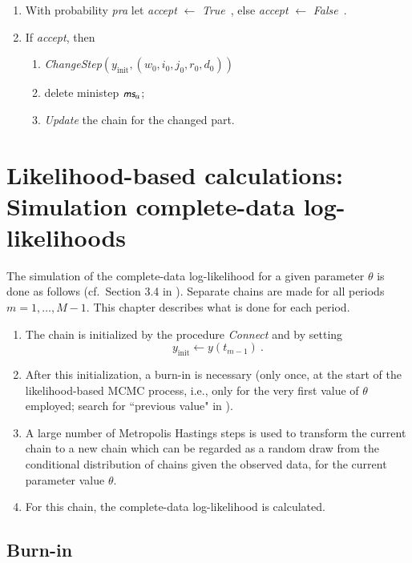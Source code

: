 \documentclass[a4paper,12pt,fleqn]{article}
\newcommand{\nnm}[1]{\textsf{\small\textit{#1}\ }}
\newcommand{\ms}{\textsl{\textsf{\small ms}}} %
\begin{document}
\begin{enumerate}[resume]
\item With probability \textit{pra} let \textit{accept} $\leftarrow$ \nnm{True}, else
      \textit{accept} $\leftarrow$ \nnm{False}.
\item If \textit{accept}, then
       \begin{enumerate}
       \item       \textit{ChangeStep}$( y_{\text{init}} , (w_0,i_0,j_0,r_0,d_0))$
       \item delete ministep $\ms_a$;
       \item  \textit{Update} the chain for the changed part.
       \end{enumerate}
\end{enumerate}


\section{Likelihood-based calculations:
         \protect\newline Simulation complete-data log-likelihoods}
\label{S_colol}

The simulation of the complete-data log-likelihood
for a given parameter $\theta$ is done as follows (cf.\ Section 3.4 in
\citet{SnijdersEA10a}). Separate chains are made for all periods
$m = 1, \ldots, M-1$. This chapter describes what is done
for each period.

\begin{enumerate}
\item The chain is initialized by the procedure \emph{Connect} and
      by setting
      \[
      y_{\text{init}}\leftarrow y(t_{m-1}) \ .
      \]
\item After this initialization, a burn-in is necessary (only once, at the start of the
      likelihood-based MCMC process, i.e., only for the very first
      value of $\theta$ employed;
      search for ``previous value" in \citet{SnijdersEA10a}).
\item A large number of Metropolis Hastings steps is used
      to transform the current chain to a new chain which can be regarded
      as a random draw from the conditional distribution of chains
      given the observed data, for the current parameter value $\theta$.
\item For this chain, the complete-data log-likelihood is calculated.
\end{enumerate}

\subsection{Burn-in}
\end{document}
